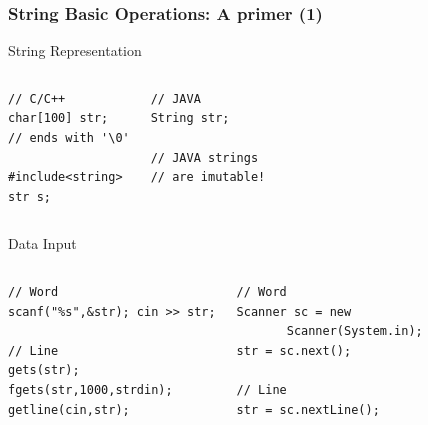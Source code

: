 \documentclass{beamer}
\begin{document}
\begin{frame}[fragile]
  \frametitle{String Basic Operations: A primer (1)}
  {\smaller
    \begin{block}{String Representation}
      \begin{columns}[T]
\begin{verbatim}
// C/C++
char[100] str;
// ends with '\0'

#include<string>
str s;
\end{verbatim}
\begin{verbatim}
// JAVA
String str;

// JAVA strings
// are imutable!
\end{verbatim}
      \end{columns}
    \end{block}

    \begin{block}{Data Input}
      \begin{columns}[T]
\begin{verbatim}
// Word
scanf("%s",&str); cin >> str;

// Line
gets(str);
fgets(str,1000,strdin);
getline(cin,str);
\end{verbatim}
\begin{verbatim}
// Word
Scanner sc = new
       Scanner(System.in);
str = sc.next();

// Line
str = sc.nextLine();
\end{verbatim}
      \end{columns}
    \end{block}
  }
\end{frame}
\end{document}
